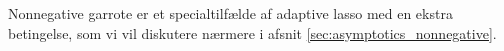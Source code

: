 Nonnegative garrote er et specialtilfælde af adaptive lasso med en ekstra betingelse, som vi vil diskutere nærmere i afsnit \ref{sec:asymptotics_nonnegative}.

%
%
